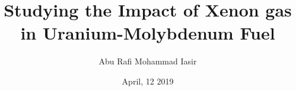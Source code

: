 \documentclass[hyper,comprehensive]{MUthesis}
\title{Studying the Impact of Xenon gas in Uranium-Molybdenum Fuel}
\author{Abu Rafi Mohammad Iasir}
\date{April, 12 2019}
\begin{document}
\frontmatter   %
\maketitle     %
\approvalpage  %



\tableofcontents
\listoftables

\listoffigures





\mainmatter %














\appendix
%
%
%



\backmatter %
%
%
\end{document}
